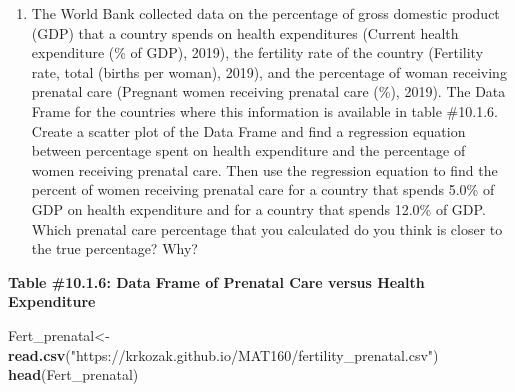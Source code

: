 \documentclass[]{book}
\newenvironment{Shaded}{\begin{snugshade}}{\end{snugshade}}
\newcommand{\KeywordTok}[1]{\textcolor[rgb]{0.13,0.29,0.53}{\textbf{#1}}}
\newcommand{\NormalTok}[1]{#1}
\newcommand{\StringTok}[1]{\textcolor[rgb]{0.31,0.60,0.02}{#1}}
\providecommand{\tightlist}{%
  \setlength{\itemsep}{0pt}\setlength{\parskip}{0pt}}
\begin{document}
\begin{enumerate}
\def\labelenumi{\arabic{enumi}.}
\setcounter{enumi}{3}
\tightlist
\item
  The World Bank collected data on the percentage of gross domestic product (GDP) that a country spends on health expenditures (Current health expenditure (\% of GDP), 2019), the fertility rate of the country (Fertility rate, total (births per woman), 2019), and the percentage of woman receiving prenatal care (Pregnant women receiving prenatal care (\%), 2019). The Data Frame for the countries where this information is available in table \#10.1.6. Create a scatter plot of the Data Frame and find a regression equation between percentage spent on health expenditure and the percentage of women receiving prenatal care. Then use the regression equation to find the percent of women receiving prenatal care for a country that spends 5.0\% of GDP on health expenditure and for a country that spends 12.0\% of GDP. Which prenatal care percentage that you calculated do you think is closer to the true percentage? Why?
\end{enumerate}

\textbf{Table \#10.1.6: Data Frame of Prenatal Care versus Health Expenditure}

\begin{Shaded}
\begin{Highlighting}[]
\NormalTok{Fert_prenatal<-}\StringTok{ }\KeywordTok{read.csv}\NormalTok{(}\StringTok{"https://krkozak.github.io/MAT160/fertility_prenatal.csv"}\NormalTok{)}
\KeywordTok{head}\NormalTok{(Fert_prenatal)}
\end{Highlighting}
\end{Shaded}
\end{document}
